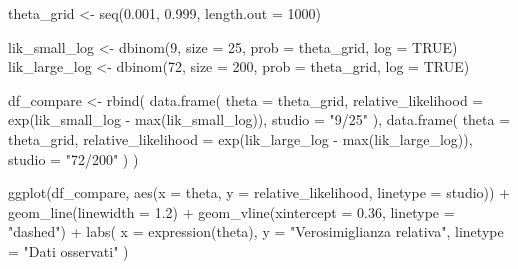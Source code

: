 \documentclass[
  italian,
  letterpaper,
  a4paper,
  11pt,
  open=any]{scrbook}
\newenvironment{Shaded}{\begin{snugshade}}{\end{snugshade}}
\newcommand{\AttributeTok}[1]{\textcolor[rgb]{0.40,0.45,0.13}{#1}}
\newcommand{\ConstantTok}[1]{\textcolor[rgb]{0.56,0.35,0.01}{#1}}
\newcommand{\DecValTok}[1]{\textcolor[rgb]{0.68,0.00,0.00}{#1}}
\newcommand{\FloatTok}[1]{\textcolor[rgb]{0.68,0.00,0.00}{#1}}
\newcommand{\FunctionTok}[1]{\textcolor[rgb]{0.28,0.35,0.67}{#1}}
\newcommand{\NormalTok}[1]{\textcolor[rgb]{0.00,0.23,0.31}{#1}}
\newcommand{\OtherTok}[1]{\textcolor[rgb]{0.00,0.23,0.31}{#1}}
\newcommand{\SpecialCharTok}[1]{\textcolor[rgb]{0.37,0.37,0.37}{#1}}
\newcommand{\StringTok}[1]{\textcolor[rgb]{0.13,0.47,0.30}{#1}}
\theoremstyle{plain}
\theoremstyle{definition}
\theoremstyle{definition}
\theoremstyle{remark}
\begin{document}
\begin{Shaded}
\begin{Highlighting}[]
\NormalTok{theta\_grid }\OtherTok{\textless{}{-}} \FunctionTok{seq}\NormalTok{(}\FloatTok{0.001}\NormalTok{, }\FloatTok{0.999}\NormalTok{, }\AttributeTok{length.out =} \DecValTok{1000}\NormalTok{)}

\NormalTok{lik\_small\_log }\OtherTok{\textless{}{-}} \FunctionTok{dbinom}\NormalTok{(}\DecValTok{9}\NormalTok{, }\AttributeTok{size =} \DecValTok{25}\NormalTok{, }\AttributeTok{prob =}\NormalTok{ theta\_grid, }\AttributeTok{log =} \ConstantTok{TRUE}\NormalTok{)}
\NormalTok{lik\_large\_log }\OtherTok{\textless{}{-}} \FunctionTok{dbinom}\NormalTok{(}\DecValTok{72}\NormalTok{, }\AttributeTok{size =} \DecValTok{200}\NormalTok{, }\AttributeTok{prob =}\NormalTok{ theta\_grid, }\AttributeTok{log =} \ConstantTok{TRUE}\NormalTok{)}

\NormalTok{df\_compare }\OtherTok{\textless{}{-}} \FunctionTok{rbind}\NormalTok{(}
  \FunctionTok{data.frame}\NormalTok{(}
    \AttributeTok{theta =}\NormalTok{ theta\_grid,}
    \AttributeTok{relative\_likelihood =} \FunctionTok{exp}\NormalTok{(lik\_small\_log }\SpecialCharTok{{-}} \FunctionTok{max}\NormalTok{(lik\_small\_log)),}
    \AttributeTok{studio =} \StringTok{"9/25"}
\NormalTok{  ),}
  \FunctionTok{data.frame}\NormalTok{(}
    \AttributeTok{theta =}\NormalTok{ theta\_grid,}
    \AttributeTok{relative\_likelihood =} \FunctionTok{exp}\NormalTok{(lik\_large\_log }\SpecialCharTok{{-}} \FunctionTok{max}\NormalTok{(lik\_large\_log)),}
    \AttributeTok{studio =} \StringTok{"72/200"}
\NormalTok{  )}
\NormalTok{)}

\FunctionTok{ggplot}\NormalTok{(df\_compare, }\FunctionTok{aes}\NormalTok{(}\AttributeTok{x =}\NormalTok{ theta, }\AttributeTok{y =}\NormalTok{ relative\_likelihood, }\AttributeTok{linetype =}\NormalTok{ studio)) }\SpecialCharTok{+}
  \FunctionTok{geom\_line}\NormalTok{(}\AttributeTok{linewidth =} \FloatTok{1.2}\NormalTok{) }\SpecialCharTok{+}
  \FunctionTok{geom\_vline}\NormalTok{(}\AttributeTok{xintercept =} \FloatTok{0.36}\NormalTok{, }\AttributeTok{linetype =} \StringTok{"dashed"}\NormalTok{) }\SpecialCharTok{+}
  \FunctionTok{labs}\NormalTok{(}
    \AttributeTok{x =} \FunctionTok{expression}\NormalTok{(theta),}
    \AttributeTok{y =} \StringTok{"Verosimiglianza relativa"}\NormalTok{,}
    \AttributeTok{linetype =} \StringTok{"Dati osservati"}
\NormalTok{  )}
\end{Highlighting}
\end{Shaded}
\end{document}
